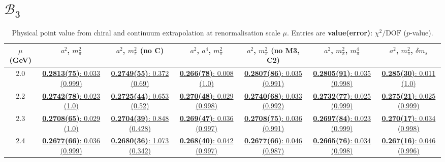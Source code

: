 \documentclass[12pt]{extarticle}
\begin{document}
\section{$\mathcal{B}_3$}
\begin{table}[h!]
\begin{center}
\begin{tabular}{|c|c|c|c|c|c|c|}
\hline
$\mu$ (GeV) & $a^2$, $m_\pi^2$& $a^2$, $m_\pi^2$ (no C)& $a^2$, $a^4$, $m_\pi^2$& $a^2$, $m_\pi^2$ (no M3, C2)& $a^2$, $m_\pi^2$, $m_\pi^4$& $a^2$, $m_\pi^2$, $\delta m_s$\\
\hline
2.0& \hyperlink{SSmPP/SUSY/a2m2_20.pdf.1}{\textbf{0.2813(75)}: 0.033 (0.999)} & \hyperlink{SSmPP/SUSY/a2m2noC_20.pdf.1}{\textbf{0.2749(55)}: 0.372 (0.69)} & \hyperlink{SSmPP/SUSY/a2a4m2_20.pdf.1}{\textbf{0.266(78)}: 0.008 (1.0)} & \hyperlink{SSmPP/SUSY/a2m2mcut_20.pdf.1}{\textbf{0.2807(86)}: 0.035 (0.991)} & \hyperlink{SSmPP/SUSY/a2m2m4_20.pdf.1}{\textbf{0.2805(91)}: 0.035 (0.998)} & \hyperlink{SSmPP/SUSY/a2m2delm_20.pdf.1}{\textbf{0.285(30)}: 0.011 (1.0)}\\
2.2& \hyperlink{SSmPP/SUSY/a2m2_22.pdf.1}{\textbf{0.2742(78)}: 0.023 (1.0)} & \hyperlink{SSmPP/SUSY/a2m2noC_22.pdf.1}{\textbf{0.2725(44)}: 0.653 (0.52)} & \hyperlink{SSmPP/SUSY/a2a4m2_22.pdf.1}{\textbf{0.270(48)}: 0.029 (0.998)} & \hyperlink{SSmPP/SUSY/a2m2mcut_22.pdf.1}{\textbf{0.2740(68)}: 0.033 (0.992)} & \hyperlink{SSmPP/SUSY/a2m2m4_22.pdf.1}{\textbf{0.2732(77)}: 0.025 (0.999)} & \hyperlink{SSmPP/SUSY/a2m2delm_22.pdf.1}{\textbf{0.275(21)}: 0.025 (0.999)}\\
2.3& \hyperlink{SSmPP/SUSY/a2m2_23.pdf.1}{\textbf{0.2708(65)}: 0.029 (1.0)} & \hyperlink{SSmPP/SUSY/a2m2noC_23.pdf.1}{\textbf{0.2704(39)}: 0.848 (0.428)} & \hyperlink{SSmPP/SUSY/a2a4m2_23.pdf.1}{\textbf{0.269(47)}: 0.036 (0.997)} & \hyperlink{SSmPP/SUSY/a2m2mcut_23.pdf.1}{\textbf{0.2708(75)}: 0.036 (0.991)} & \hyperlink{SSmPP/SUSY/a2m2m4_23.pdf.1}{\textbf{0.2697(84)}: 0.023 (0.999)} & \hyperlink{SSmPP/SUSY/a2m2delm_23.pdf.1}{\textbf{0.270(17)}: 0.034 (0.998)}\\
2.4& \hyperlink{SSmPP/SUSY/a2m2_24.pdf.1}{\textbf{0.2677(66)}: 0.036 (0.999)} & \hyperlink{SSmPP/SUSY/a2m2noC_24.pdf.1}{\textbf{0.2680(36)}: 1.073 (0.342)} & \hyperlink{SSmPP/SUSY/a2a4m2_24.pdf.1}{\textbf{0.268(40)}: 0.042 (0.997)} & \hyperlink{SSmPP/SUSY/a2m2mcut_24.pdf.1}{\textbf{0.2677(66)}: 0.046 (0.987)} & \hyperlink{SSmPP/SUSY/a2m2m4_24.pdf.1}{\textbf{0.2665(76)}: 0.034 (0.998)} & \hyperlink{SSmPP/SUSY/a2m2delm_24.pdf.1}{\textbf{0.267(16)}: 0.046 (0.996)}\\
\hline
\end{tabular}
\caption{Physical point value from chiral and continuum extrapolation at renormalisation scale $\mu$. Entries are \textbf{value(error)}: $\chi^2/\text{DOF}$ ($p$-value).}
\end{center}
\end{table}
\end{document}
